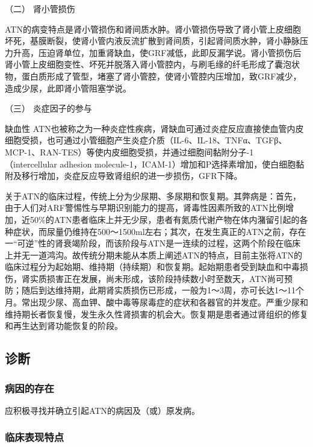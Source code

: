 \hypertarget{text00083.htmlux5cux23CHP3-7-4-2-2}{}
（二） 肾小管损伤

ATN的病变特点是肾小管损伤和肾间质水肿。肾小管损伤导致了肾小管上皮细胞坏死，基膜断裂，使肾小管内液反流扩散到肾间质，引起肾间质水肿，肾小静脉压力升高，压迫肾单位，加重肾缺血，使GRF减低，此即反漏学说。肾小管损伤后肾小管上皮细胞变性、坏死并脱落入肾小管腔内，与刷毛缘的纤毛形成了囊泡状物，蛋白质形成了管型，堵塞了肾小管腔，使肾小管腔内压增加，致GRF减少，造成少尿，此即肾小管阻塞学说。

\hypertarget{text00083.htmlux5cux23CHP3-7-4-2-3}{}
（三） 炎症因子的参与

缺血性
ATN也被称之为一种炎症性疾病，肾缺血可通过炎症反应直接使血管内皮细胞受损，也可通过小管细胞产生炎症介质（IL-6、IL-18、TNFα、TGFβ、MCP-1、RAN-TES）等使内皮细胞受损，并通过细胞间黏附分子-1
（intercellular adhesion
molecule-1，ICAM-1）增加和P选择素增加，使白细胞黏附及移行增加，炎症反应导致肾组织的进一步损伤，GFR下降。

关于ATN的临床过程，传统上分为少尿期、多尿期和恢复期。其弊病是：首先，由于人们对ARF警惕性与早期识别能力的提高，肾毒性因素所致的ATN比例增加，近50\%的ATN患者临床上并无少尿，患者有氮质代谢产物在体内潴留引起的各种症状，而尿量仍维持在500～1500ml左右；其次，在发生真正的ATN之前，存在一“可逆”性的肾衰竭阶段，而该阶段与ATN是一连续的过程，这两个阶段在临床上并无一道鸿沟。故传统分期未能从本质上阐述ATN的特点，目前主张将ATN的临床过程分为起始期、维持期（持续期）和恢复期。起始期患者受到缺血和中毒损伤，肾实质损害正在发展，尚未形成，该阶段持续数小时至数天，ATN尚可预防；随后到达维持期，此期肾实质损伤已形成，一般为1～3周，亦可长达1～11个月。常出现少尿、高血钾、酸中毒等尿毒症的症状和各器官的并发症。严重少尿和维持期长者恢复慢，发生永久性肾损害的机会大。恢复期是患者通过肾组织的修复和再生达到肾功能恢复的阶段。

\subsection{诊断}

\subsubsection{病因的存在}

应积极寻找并确立引起ATN的病因及（或）原发病。

\subsubsection{临床表现特点}

